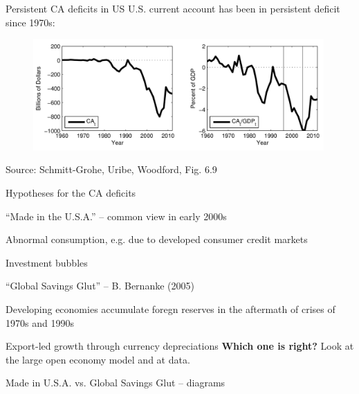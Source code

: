 \documentclass{beamer}
\newenvironment{mytemize}
{\vfill\itemize[nolistsep,itemsep=\fill,label=\color{blue}{$\triangleright$}]}
  {\enditemize}
\newenvironment{mynumerate}
{\vfill\enumerate[nolistsep,itemsep=\fill,label=\arabic*.]}
  {\endenumerate}
\begin{document}
\begin{frame}{Persistent CA deficits in US}
  U.S. current account has been in persistent deficit since 1970s:
  \begin{figure}
	\centering
	\includegraphics[width = 0.99\textwidth]{FIGURES/CA_US.png}
  \end{figure}
  \vspace{-0.5cm}
  \begin{minipage}{\columnwidth}
  \footnotesize
  Source: Schmitt-Grohe, Uribe, Woodford, Fig. 6.9
  \end{minipage}
\end{frame}

\begin{frame}{Hypotheses for the CA deficits}
  \begin{mynumerate}
  \item ``Made in the U.S.A.'' -- common view in early 2000s
	\begin{mytemize}
	\item Abnormal consumption, e.g. due to developed consumer credit markets
	\item Investment bubbles
	\end{mytemize}
  \item ``Global Savings Glut'' -- B. Bernanke (2005)
	\begin{mytemize}
	\item Developing economies accumulate foregn reserves in the aftermath of crises of 1970s and 1990s
	\item Export-led growth through currency depreciations
	\end{mytemize}
  \end{mynumerate}
  \vfill
  \textbf{Which one is right?} Look at the large open economy model and at data.
\end{frame}

\begin{frame}{Made in U.S.A. vs. Global Savings Glut -- diagrams} 
  
\end{frame}
\end{document}
